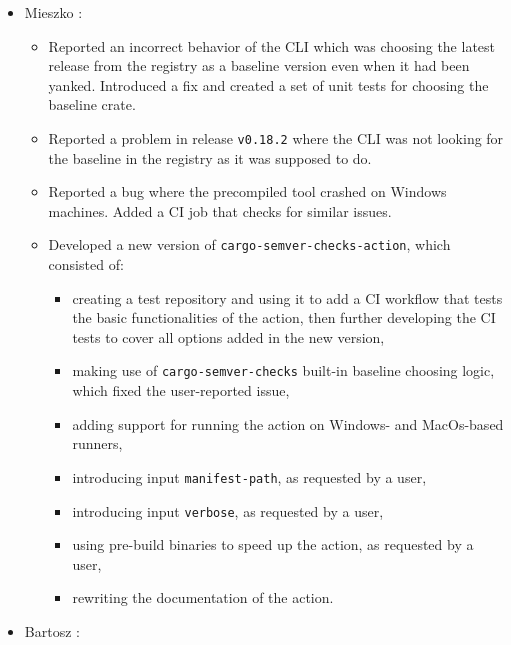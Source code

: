 \documentclass[licencjacka,en]{pracamgr}
\begin{document}
\begin{itemize}
	\item Mieszko \cite{responsibilities_mieszko}:
		\begin{itemize}
			\item Reported an incorrect behavior of the CLI which was choosing the latest release from the registry as
				a baseline version even when it had been yanked. Introduced a fix and
				created a set of unit tests for choosing the baseline crate.

			\item Reported a problem in release \texttt{v0.18.2} where the CLI was not looking for the baseline in the
				registry as it was supposed to do.

			\item Reported a bug where the precompiled tool crashed on Windows machines.
				Added a CI job that checks for similar issues.

			\item Developed a new version of \texttt{cargo-semver-checks-action}, which consisted of:
			\begin{itemize}
				\item creating a test repository \cite{responsibilities_mieszko_action_tests} and using it to add a CI workflow that tests
					the basic functionalities of the action, then further developing the
					CI tests to cover all options added in the new version,
				\item making use of \texttt{cargo-semver-checks} built-in baseline choosing logic, which fixed the
					user-reported issue,
				\item adding support for running the action on Windows- and MacOs-based runners,
				\item introducing input \texttt{manifest-path}, as requested by a user,
				\item introducing input \texttt{verbose}, as requested by a user,
				\item using pre-build binaries to speed up the action, as requested by a user,
				\item rewriting the documentation of the action.
			\end{itemize}
		\end{itemize}

	\item Bartosz \cite{responsibilities_bartosz}:
		\begin{itemize}


\end{itemize}
\end{itemize}
\end{document}
